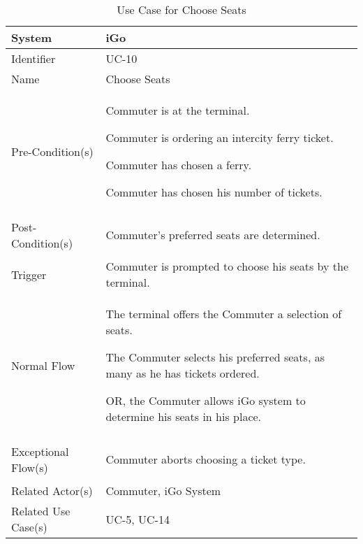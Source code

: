 \begin{table}[ht]
    \centering
    \begin{tabular}{|l|p{11cm}|}
        \hline
        System             & iGo\\
        \hline
        Identifier         & UC-10 \\
        \hline
        Name               & Choose Seats \\
        \hline
        Pre-Condition(s)   & 
        \begin{enumerate*}[itemjoin=\newline]
            \item Commuter is at the terminal.
            \item Commuter is ordering an intercity ferry ticket.
            \item Commuter has chosen a ferry.
            \item Commuter has chosen his number of tickets.
        \end{enumerate*} \\
        \hline
        Post-Condition(s)  & 
        \begin{enumerate*}[itemjoin=\newline]
            \item Commuter's preferred seats are determined. 
        \end{enumerate*} \\
        \hline
        Trigger            & Commuter is prompted to choose his seats by the terminal. \\
        \hline
        Normal Flow        & 
        \begin{enumerate*}[itemjoin=\newline]
            \item The terminal offers the Commuter a selection of seats.
            \item The Commuter selects his preferred seats, as many as he has tickets ordered.
            \item OR, the Commuter allows iGo system to determine his seats in his place.
        \end{enumerate*} \\
        \hline
        Exceptional Flow(s)& 
        \begin{enumerate*}[itemjoin=\newline]
            \item Commuter aborts choosing a ticket type.
        \end{enumerate*} \\
        \hline
        Related Actor(s)   & Commuter, iGo System \\
        \hline
        Related Use Case(s)& UC-5, UC-14\\
        \hline
    \end{tabular}
    \caption{Use Case for Choose Seats}
    \label{tab:UC_ChooseSeats}
\end{table}

